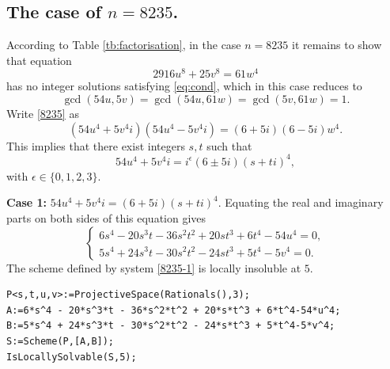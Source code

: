 \documentclass[a4paper,12pt,english,reqno]{amsart}
\begin{document}
\subsection{The case of $n=8235$.}%
According to Table \ref{tb:factorisation}, in the case $n=8235$ it remains to
show that equation
\begin{equation}\label{8235}
2916u^8+25v^8=61 w^4
\end{equation}
has no integer solutions satisfying \eqref{eq:cond}, which in this case reduces to  \[\gcd(54u,5v)=\gcd(54u,61w)=\gcd(5v,61w)=1.\]
Write \eqref{8235} as 
\begin{equation} (54u^4+5v^4i)(54u^4-5v^4i)=(6+5i)(6-5i)w^4.
\end{equation}
This implies that there exist integers $s,t$ such that 
\[54u^4+5v^4i=i^{\epsilon}(6\pm 5i)(s+ti)^4,\]
with $\epsilon \in \{0,1,2,3\}$.


{\bf Case 1:} $54u^4+5v^4i=(6+5i)(s+ti)^4$. Equating the real and imaginary parts on both sides of this equation gives
\begin{equation}\label{8235-1}
\begin{cases}
6s^4 - 20s^3t - 36s^2t^2 + 20st^3 + 6t^4 - 54u^4=0,\\
5s^4 + 24s^3t - 30s^2t^2 - 24st^3 + 5t^4 - 5v^4=0.
\end{cases}
\end{equation}
The scheme defined by system \eqref{8235-1} is locally insoluble at $5$.


\begin{lstlisting}
P<s,t,u,v>:=ProjectiveSpace(Rationals(),3);
A:=6*s^4 - 20*s^3*t - 36*s^2*t^2 + 20*s*t^3 + 6*t^4-54*u^4;
B:=5*s^4 + 24*s^3*t - 30*s^2*t^2 - 24*s*t^3 + 5*t^4-5*v^4;
S:=Scheme(P,[A,B]);
IsLocallySolvable(S,5);
\end{lstlisting}
\end{document}

